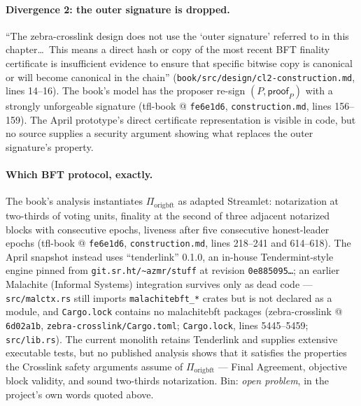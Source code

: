 \documentclass[11pt,a4paper]{article}
\theoremstyle{definition}
\begin{document}
\paragraph{Divergence 2: the outer signature is dropped.} ``The
zebra-crosslink design does not use the `outer signature' referred to in
this chapter\ldots\ This means a direct hash or copy of the most recent
BFT finality certificate is insufficient evidence to ensure that specific
bitwise copy is canonical or will become canonical in the chain''
(\texttt{book/src/design/cl2-construction.md}, lines 14--16). The book's
model has the proposer re-sign $(P, \mathsf{proof}_P)$ with a strongly
unforgeable signature (tfl-book @ \texttt{fe6e1d6},
\texttt{construction.md}, lines 156--159). The April prototype's direct
certificate representation is visible in code, but no source supplies a
security argument showing what replaces the outer signature's property.

\paragraph{Which BFT protocol, exactly.} The book's analysis instantiates
$\Pi_{\mathrm{origbft}}$ as adapted Streamlet: notarization at two-thirds
of voting units, finality at the second of three adjacent notarized blocks
with consecutive epochs, liveness after five consecutive honest-leader
epochs (tfl-book @ \texttt{fe6e1d6}, \texttt{construction.md}, lines
218--241 and 614--618). The April snapshot instead uses ``tenderlink''
0.1.0, an in-house Tendermint-style engine pinned from
\texttt{git.sr.ht/\textasciitilde azmr/stuff} at revision
\texttt{0e885095\ldots}; an earlier Malachite (Informal Systems)
integration survives only as dead code --- \texttt{src/malctx.rs} still
imports \texttt{malachitebft\_*} crates but is not declared as a module,
and \texttt{Cargo.lock} contains no malachitebft packages
(zebra-crosslink @ \texttt{6d02a1b}, \texttt{zebra-crosslink/Cargo.toml};
\texttt{Cargo.lock}, lines 5445--5459; \texttt{src/lib.rs}). The current
monolith retains Tenderlink and supplies extensive executable tests, but
no published analysis shows that it satisfies the properties the Crosslink
safety arguments assume of $\Pi_{\mathrm{origbft}}$ --- Final Agreement,
objective block validity, and sound two-thirds notarization. Bin:
\emph{open problem}, in the project's own words quoted above.
\end{document}
